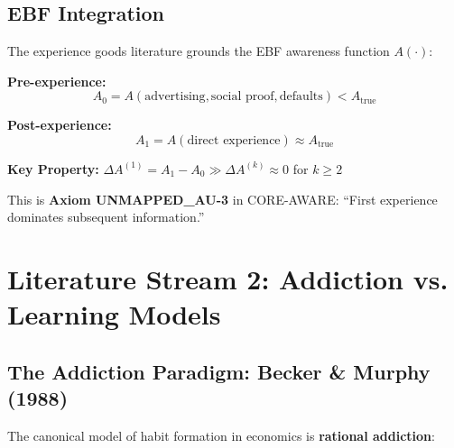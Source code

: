 \documentclass[11pt, a4paper]{article}
\begin{document}
\subsection{EBF Integration}

\begin{tcolorbox}[colback=green!5!white, colframe=green!75!black,
    title=Experience Goods $\rightarrow$ CORE-AWARE]

The experience goods literature grounds the EBF awareness function $A(\cdot)$:

\textbf{Pre-experience:}
\begin{equation}
A_0 = A(\text{advertising}, \text{social proof}, \text{defaults}) < A_{\text{true}}
\end{equation}

\textbf{Post-experience:}
\begin{equation}
A_1 = A(\text{direct experience}) \approx A_{\text{true}}
\end{equation}

\textbf{Key Property:} $\Delta A^{(1)} = A_1 - A_0 \gg \Delta A^{(k)} \approx 0$ for $k \geq 2$

This is \textbf{Axiom UNMAPPED_AU-3} in CORE-AWARE: ``First experience dominates subsequent information.''

\end{tcolorbox}


\section{Literature Stream 2: Addiction vs. Learning Models}
\label{sec:lrn-addiction-vs-learning}

\subsection{The Addiction Paradigm: Becker \& Murphy (1988)}

The canonical model of habit formation in economics is \textbf{rational addiction}:
\end{document}
